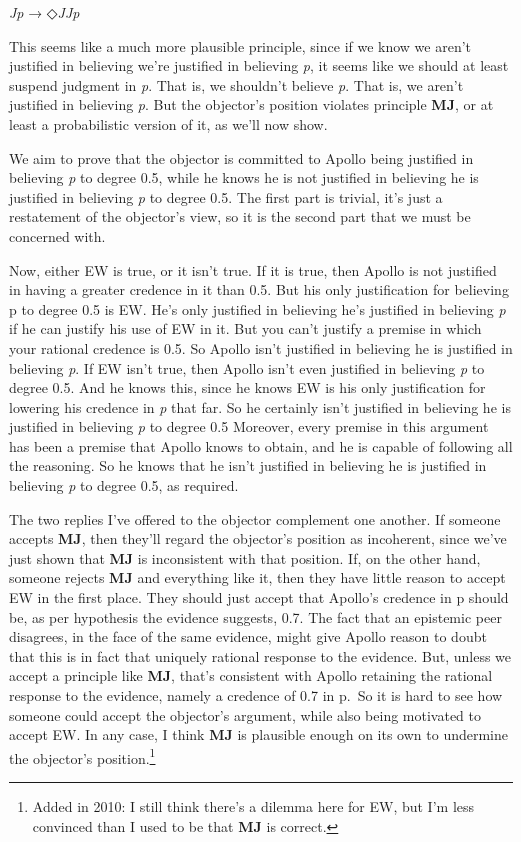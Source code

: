 \documentclass[
  10pt,
  letterpaper,
  DIV=11,
  numbers=noendperiod,
  twoside]{scrartcl}
\providecommand{\tightlist}{%
  \setlength{\itemsep}{0pt}\setlength{\parskip}{0pt}}\usepackage{longtable,booktabs,array}
\begin{document}
\begin{description}
\tightlist
\item[MJ]
\emph{Jp} → ◇\emph{JJp}
\end{description}

This seems like a much more plausible principle, since if we know we
aren't justified in believing we're justified in believing \emph{p}, it
seems like we should at least suspend judgment in \emph{p}. That is, we
shouldn't believe \emph{p}. That is, we aren't justified in believing
\emph{p}. But the objector's position violates principle \textbf{MJ}, or
at least a probabilistic version of it, as we'll now show.

We aim to prove that the objector is committed to Apollo being justified
in believing \emph{p} to degree 0.5, while he knows he is not justified
in believing he is justified in believing \emph{p} to degree 0.5. The
first part is trivial, it's just a restatement of the objector's view,
so it is the second part that we must be concerned with.

Now, either EW is true, or it isn't true. If it is true, then Apollo is
not justified in having a greater credence in it than 0.5. But his only
justification for believing p to degree 0.5 is EW. He's only justified
in believing he's justified in believing \emph{p} if he can justify his
use of EW in it. But you can't justify a premise in which your rational
credence is 0.5. So Apollo isn't justified in believing he is justified
in believing \emph{p}. If EW isn't true, then Apollo isn't even
justified in believing \emph{p} to degree 0.5. And he knows this, since
he knows EW is his only justification for lowering his credence in
\emph{p} that far. So he certainly isn't justified in believing he is
justified in believing \emph{p} to degree 0.5 Moreover, every premise in
this argument has been a premise that Apollo knows to obtain, and he is
capable of following all the reasoning. So he knows that he isn't
justified in believing he is justified in believing \emph{p} to degree
0.5, as required.

The two replies I've offered to the objector complement one another. If
someone accepts \textbf{MJ}, then they'll regard the objector's position
as incoherent, since we've just shown that \textbf{MJ} is inconsistent
with that position. If, on the other hand, someone rejects \textbf{MJ}
and everything like it, then they have little reason to accept EW in the
first place. They should just accept that Apollo's credence in p should
be, as per hypothesis the evidence suggests, 0.7. The fact that an
epistemic peer disagrees, in the face of the same evidence, might give
Apollo reason to doubt that this is in fact that uniquely rational
response to the evidence. But, unless we accept a principle like
\textbf{MJ}, that's consistent with Apollo retaining the rational
response to the evidence, namely a credence of 0.7 in p.~So it is hard
to see how someone could accept the objector's argument, while also
being motivated to accept EW. In any case, I think \textbf{MJ} is
plausible enough on its own to undermine the objector's
position.\footnote{Added in 2010: I still think there's a dilemma here
  for EW, but I'm less convinced than I used to be that \textbf{MJ} is
  correct.}
\end{document}
